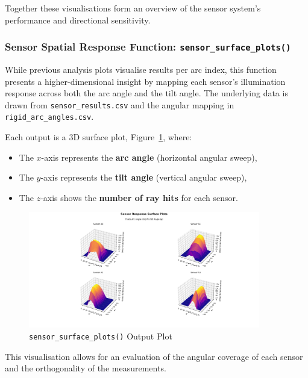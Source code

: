 \vspace{1em}
Together these visualisations form an overview of the sensor system's performance and directional sensitivity. 

\subsubsection{Sensor Spatial Response Function: \texttt{sensor\_surface\_plots()}}
While previous analysis plots visualise results per arc index, this function presents a higher-dimensional insight by mapping each sensor’s illumination response across both the arc angle and the tilt angle. The underlying data is drawn from \texttt{sensor\_results.csv} and the angular mapping in \texttt{rigid\_arc\_angles.csv}.

Each output is a 3D surface plot, Figure~\ref{fig:Sensor Surface Output Plot}, where:
\begin{itemize}
    \item The $x$-axis represents the \textbf{arc angle} (horizontal angular sweep),
    \item The $y$-axis represents the \textbf{tilt angle} (vertical angular sweep),
    \item The $z$-axis shows the \textbf{number of ray hits} for each sensor.
\end{itemize}

\begin{figure}[htbp] %
    \centering
    \includegraphics[width=0.9\textwidth]{chapters/methodology/SoftwareModel/images/Sensor Surface Plots.png} %
    \caption{\texttt{sensor\_surface\_plots()} Output Plot}       %
    \label{fig:Sensor Surface Output Plot}            %
\end{figure}  

This visualisation allows for an evaluation of the angular coverage of each sensor and the orthogonality of the measurements.

